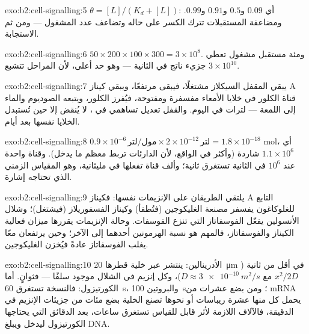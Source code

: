 \begin{solution}{exo:b2:cell-signalling:5}
$\theta = [L]/(K_d + [L])$: أي $0.09$ و$0.5$ و$0.91$ و$0.99$. ومضاعفة
المستقبلات تترك الكسر على حاله وتضاعف عدد
المشغول --- ومن ثم الاستجابة.
\end{solution}

\begin{solution}{exo:b2:cell-signalling:6}
$50\times 200\times 100\times 300 = 3\times 10^{8}$. ومئة مستقبل
مشغول تعطي $3\times 10^{10}$ جزيء ناتج في الثانية --- وهو
حد أعلى، لأن المراحل تتشبع.
\end{solution}

\begin{solution}{exo:b2:cell-signalling:7}
يبقي  المقفل السيكلاز مشتغلًا، فيبقى  مرتفعًا، ويبقي كيناز A
قناة الكلور في خلايا الأمعاء مفسفرة
ومفتوحة، فيُفرز الكلور، ويتبعه الصوديوم والماء إلى
اللمعة --- لترات في اليوم. والقفل تعديل تساهمي في ، لا يُنقض إلا حين تُستبدل الخلايا نفسها بعد
أيام.
\end{solution}

\begin{solution}{exo:b2:cell-signalling:8}
$0.9\times 10^{-6}\,\text{مول/لتر}\times 2\times 10^{-12}\,\text{لتر} =
1.8\times 10^{-18}$ mol، أي $1.1\times 10^{6}$ شاردة (وأكثر في الواقع، لأن
الدارئات تربط معظم ما يدخل). وقناة واحدة عند $10^{6}$ في الثانية
تستغرق ثانية؛ وألف قناة تفعلها في مليثانية،
وهو المقياس الزمني الذي تحتاجه إشارة.
\end{solution}

\begin{solution}{exo:b2:cell-signalling:9}
يلتقي الطريقان على الإنزيمات نفسها: فكيناز A التابع للغلوكاغون
يفسفر مصنعة الغليكوجين (فتُطفأ) وكيناز الفسفوريلاز
(فيشتغل)؛ وشلال الأنسولين يفعّل الفوسفاتاز التي تنزع
الفوسفات. وحالة الإنزيمات يقررها ميزان فعالية الكيناز
والفوسفاتاز، فالمهم هو نسبة الهرمونين
أحدهما إلى الآخر؛ وحين يرتفعان معًا يغلب الفوسفاتاز عادةً فيُخزن
الغليكوجين.
\end{solution}

\begin{solution}{exo:b2:cell-signalling:10}
الأدرينالين: ينتشر  عبر خلية قطرها \qty{20}{\micro m} في أقل من
ثانية ($x^{2}/2D$ مع $D \approx \qty{3e-10}{m^2/s}$)، وكل
إنزيم في الشلال موجود سلفًا --- فثوانٍ. أما الكورتيزول: فالنسخة
تستغرق \qty{60}{s}، والبروتين \qty{100}{s}؛ ومن بضع
عشرات من mRNA يحمل كل منها عشرة ريباسات أو نحوها تصنع الخلية بضع
مئات من جزيئات الإنزيم في الدقيقة، فالآلاف اللازمة لأثر
قابل للقياس تستغرق ساعات، بعد الدقائق التي يحتاجها الكورتيزول
ليدخل ويبلغ DNA.
\end{solution}


